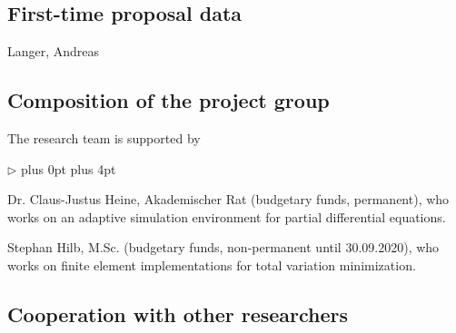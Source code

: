\documentclass[enabledeprecatedfontcommands,cleardoublepage=empty,headsepline,twoside,11pt,DIV=15,BCOR=12mm,final]{scrartcl}
\renewenvironment{itemize}
{\begin{list}{$\triangleright$}{\labelwidth-2mm \leftmargin3mm %
  \itemsep5pt plus 0pt  \topsep3pt \parsep1pt plus 4pt \labelsep2mm}}
{\end{list}}
\newcommand{\dunefem}{\textsf{DUNE-FEM}\xspace}
\begin{document}
\subsection{First-time proposal data}
Langer, Andreas

\subsection{Composition of the project group}
\label{sec:comp-proj-group}

The research team is supported by
\begin{itemize}
\item Dr. Claus-Justus Heine, Akademischer Rat (budgetary funds, permanent), who works on an adaptive simulation environment for partial differential equations.
\item Stephan Hilb, M.Sc. (budgetary funds, non-permanent until 30.09.2020), who works on finite element implementations for total variation minimization.
  
\end{itemize}

\subsection{Cooperation with other researchers}
\label{sec:coop-with-other}
\end{document}
